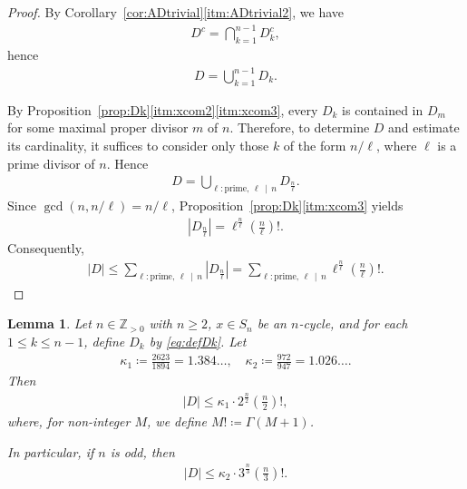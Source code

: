 \documentclass[12pt,reqno]{amsart}
\newcommand{\Zp}{\mathbb{Z}_{> 0}}						%
\newcommand{\q}{\quad}									%
\newcommand{\f}[2]{\frac{#1}{#2}}							%
\newcommand{\ceq}{\coloneqq} 							%
\newcommand{\vt}[1]{\left\lvert #1 \right\rvert}					%
\theoremstyle{mythmstyle}
\newtheorem{lemma}{Lemma}[section]
\theoremstyle{mydefstyle}
\newcommand{\propref}[1]{Proposition~\ref{#1}}
\newcommand{\corref}[1]{Corollary~\ref{#1}}
\numberwithin{equation}{section}
\begin{document}
\begin{proof}
By \corref{cor:ADtrivial}\ref{itm:ADtrivial2}, we have
\begin{align}
D^{c} = \bigcap_{k=1}^{n-1} D_{k}^{c},
\end{align}
hence
\begin{align}
D = \bigcup_{k=1}^{n-1} D_{k}.
\end{align}

By \propref{prop:Dk}\ref{itm:xcom2}\ref{itm:xcom3}, every $D_k$ is contained in
$D_m$ for some maximal proper divisor $m$ of $n$. Therefore, to determine $D$
and estimate its cardinality, it suffices to consider only those $k$ of the form
$n/\ell$, where $\ell$ is a prime divisor of $n$.
Hence
\begin{align}
D = \bigcup_{\ell\colon \text{prime},\, \ell\, \mid\, n} D_{\f{n}{\ell}}.
\end{align}
Since $\gcd(n, n/\ell) = n/\ell$, \propref{prop:Dk}\ref{itm:xcom3} yields
\begin{align}
\label{eq:Dnp}
\vt{D_{\f{n}{\ell}}} = \ell^{\f{n}{\ell}}\left(\f{n}{\ell}\right)!.
\end{align}
Consequently,
\begin{align}
\vt{D} \le \sum_{\ell\colon \text{prime},\, \ell\, \mid\, n} \vt{D_{\f{n}{\ell}}}
=  \sum_{\ell\colon \text{prime},\, \ell\, \mid\, n} \ell^{\f{n}{\ell}}\left(\f{n}{\ell}\right)!.
\end{align}
\end{proof}

\begin{lemma}
\label{lem:Dupper}
Let $n \in \Zp$ with $n \ge 2$, $x \in S_{n}$ be an $n$-cycle, and for each $1 \le k \le n-1$, define $D_{k}$ by \eqref{eq:defDk}.
Let
\begin{align}
\kappa_{1} \ceq \f{2623}{1894} = 1.384\ldots, \q \kappa_{2} \ceq \f{972}{947} = 1.026\ldots.
\end{align}
Then
\begin{align}
\label{eq:Dupper}
\vt{D} \le \kappa_{1}\cdot 2^{\f{n}{2}}\left(\f{n}{2}\right)!,
\end{align}
where, for non-integer $M$, we define $M! \ceq \Gamma(M+1)$.

In particular, if $n$ is odd, then
\begin{align}
\label{eq:Dupperodd}
\vt{D} \le \kappa_{2}\cdot3^{\f{n}{3}}\left(\f{n}{3}\right)!.
\end{align}
\end{lemma}
\end{document}
